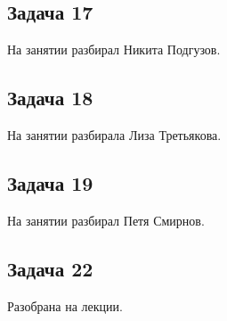 \subsection{Задача 17}
	На занятии разбирал Никита Подгузов.
	\TODO

\subsection{Задача 18}
	На занятии разбирала Лиза Третьякова.
	\TODO

\subsection{Задача 19}
	На занятии разбирал Петя Смирнов.
	\TODO

\subsection{Задача 22}
	Разобрана на лекции.
